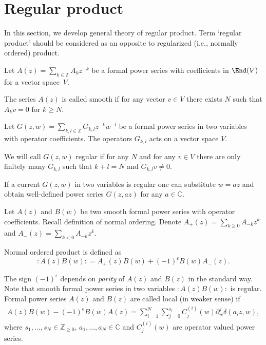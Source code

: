 \appendix
\section{Regular product} \label{nonorm}

In this section, we develop general theory of regular product. Term `regular product' should be considered as an opposite to regularized (i.e., normally ordered) product.

Let $A(z) = \sum\limits_{k \in \mathbb{Z}} A_k z^{-k}$ be a formal power series with coefficients in $\End(V)$ for a vector space~$V$.
\begin{Definition}
The series $A(z)$ is called smooth if for any vector $v \in V$ there exists $N$ such that $A_k v = 0$ for $k \geqslant N$.
\end{Definition}
Let $G(z,w) = \sum\limits_{k,l \in \mathbb{Z}}G_{k,l} z^{-k} w^{-l}$ be a formal power series in two variables with operator coefficients. The operators $G_{k,l}$ acts on a vector space $V$.
\begin{Definition} \label{def:regular}
We will call $G(z,w)$ regular if for any $N$ and for any $v \in V$ there are only finitely many $G_{k,l}$ such that $k+l=N$ and $G_{k,l} v \neq 0$.
\end{Definition}

If a current $G(z,w)$ in two variables is regular one can substitute $w=az$ and obtain well-defined power series $G(z, az)$ for any $a \in \mathbb{C}$.

Let $A(z)$ and $B(w)$ be two smooth formal power series with operator coefficients. Recall definition of normal ordering. Denote $A_+ (z) = \sum\limits_{k \geqslant 0} A_{-k} z^{k}$ and $A_- (z) = \sum\limits_{k < 0} A_{-k} z^{k}$.

\begin{Definition} \label{def:norm}
Normal ordered product is defined as
\[ {: \! A(z) B(w) \! :} = A_+ (z) B(w) + (-1)^{\epsilon} B(w) A_- (z).\]
\end{Definition}

The sign $(-1)^{\epsilon}$ depends on \emph{parity} of $A(z)$ and $B(z)$ in the standard way. Note that smooth formal power series in two variables $: \! A(z) B(w) \! :$ is regular. Formal power series $A(z)$ and $B(z)$ are called local (in weaker sense) if
\begin{gather} \label{def:weakLocal}
A(z)B(w)-(-1)^{\epsilon} B(w) A(z) = \sum_{i=1}^{N} \sum_{j=0}^{s_i} C_{j}^{(i)} (w) \partial_w^j \delta(a_i z, w),
\end{gather}
where $s_1, \dots, s_N \in \mathbb{Z}_{\geq 0}$, $a_1, \dots, a_N \in \mathbb{C}$ and $C_{j}^{(i)} \! (w)$ are operator valued power series.

